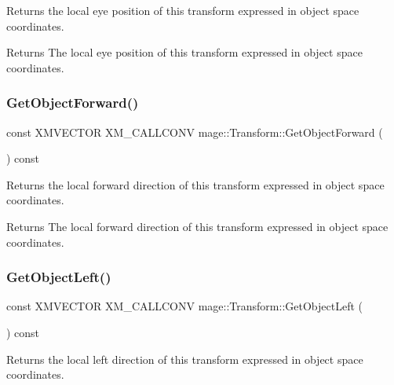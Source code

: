 Returns the local eye position of this transform expressed in object space coordinates.

\begin{DoxyReturn}{Returns}
The local eye position of this transform expressed in object space coordinates. 
\end{DoxyReturn}
\hypertarget{classmage_1_1_transform_afcf3f671a33448e40de43ef3cbaeb510}{}\label{classmage_1_1_transform_afcf3f671a33448e40de43ef3cbaeb510} 
\subsubsection{\texorpdfstring{Get\+Object\+Forward()}{GetObjectForward()}}
{\footnotesize\ttfamily const X\+M\+V\+E\+C\+T\+OR X\+M\+\_\+\+C\+A\+L\+L\+C\+O\+NV mage\+::\+Transform\+::\+Get\+Object\+Forward (\begin{DoxyParamCaption}{ }\end{DoxyParamCaption}) const\hspace{0.3cm}{\ttfamily [noexcept]}}

Returns the local forward direction of this transform expressed in object space coordinates.

\begin{DoxyReturn}{Returns}
The local forward direction of this transform expressed in object space coordinates. 
\end{DoxyReturn}
\hypertarget{classmage_1_1_transform_adb897f8d2c92b4310e5b0348fb0b6f49}{}\label{classmage_1_1_transform_adb897f8d2c92b4310e5b0348fb0b6f49} 
\subsubsection{\texorpdfstring{Get\+Object\+Left()}{GetObjectLeft()}}
{\footnotesize\ttfamily const X\+M\+V\+E\+C\+T\+OR X\+M\+\_\+\+C\+A\+L\+L\+C\+O\+NV mage\+::\+Transform\+::\+Get\+Object\+Left (\begin{DoxyParamCaption}{ }\end{DoxyParamCaption}) const\hspace{0.3cm}{\ttfamily [noexcept]}}

Returns the local left direction of this transform expressed in object space coordinates.

